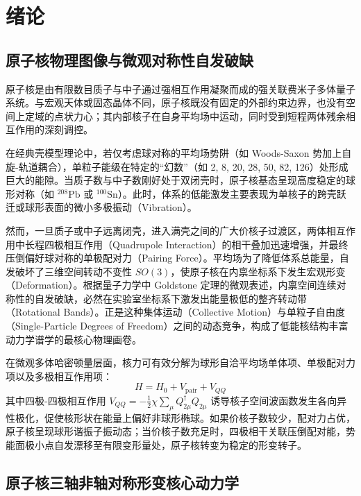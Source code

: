 
\chapter{绪论}
\label{ch:introduction}

\section{原子核物理图像与微观对称性自发破缺}
\label{sec:nuclear_physics_picture}

原子核是由有限数目质子与中子通过强相互作用凝聚而成的强关联费米子多体量子系统。与宏观天体或固态晶体不同，原子核既没有固定的外部约束边界，也没有空间上定域的点状力心；其内部核子在自身平均场中运动，同时受到短程两体残余相互作用的深刻调控。

在经典壳模型理论中，若仅考虑球对称的平均场势阱（如 Woods-Saxon 势加上自旋-轨道耦合），单粒子能级在特定的“幻数”（如 2, 8, 20, 28, 50, 82, 126）处形成巨大的能隙。当质子数与中子数刚好处于双闭壳时，原子核基态呈现高度稳定的球形对称（如 $^{208}\text{Pb}$ 或 $^{100}\text{Sn}$）。此时，体系的低能激发主要表现为单核子的跨壳跃迁或球形表面的微小多极振动（Vibration）。

然而，一旦质子或中子远离闭壳，进入满壳之间的广大价核子过渡区，两体相互作用中长程四极相互作用（Quadrupole Interaction）的相干叠加迅速增强，并最终压倒偏好球对称的单极配对力（Pairing Force）。平均场为了降低体系总能量，自发破坏了三维空间转动不变性 $SO(3)$，使原子核在内禀坐标系下发生宏观形变（Deformation）。根据量子力学中 Goldstone 定理的微观表述，内禀空间连续对称性的自发破缺，必然在实验室坐标系下激发出能量极低的整齐转动带（Rotational Bands）。正是这种集体运动（Collective Motion）与单粒子自由度（Single-Particle Degrees of Freedom）之间的动态竞争，构成了低能核结构丰富动力学谱学的最核心物理画卷。

在微观多体哈密顿量层面，核力可有效分解为球形自洽平均场单体项、单极配对力项以及多极相互作用项：
\begin{equation}
    H = H_0 + V_{\text{pair}} + V_{QQ}
    \label{eq:schematic_hamiltonian}
\end{equation}
其中四极-四极相互作用 $V_{QQ} = -\frac{1}{2} \chi \sum_{\mu} Q_{2\mu}^\dagger Q_{2\mu}$ 诱导核子空间波函数发生各向异性极化，促使核形状在能量上偏好非球形椭球。如果价核子数较少，配对力占优，原子核呈现球形谐振子振动态；当价核子数充足时，四极相干关联压倒配对能，势能面极小点自发漂移至有限变形量处，原子核转变为稳定的形变转子。

\section{原子核三轴非轴对称形变核心动力学}
\label{sec:triaxial_core_dynamics}

